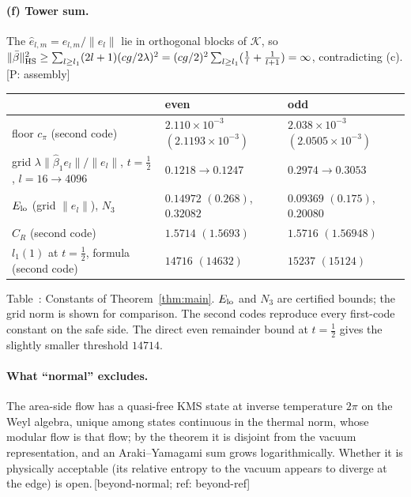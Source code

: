 \documentclass[11pt]{article}
\newcommand{\cK}{\mathcal{K}}
\newcommand{\ev}[1]{\,{\textsf{\scriptsize[#1]}}}
\newcommand{\tabcap}[2]{\par\smallskip\refstepcounter{table}\label{#1}{\small Table~\thetable: #2}\par}
\begin{document}
\paragraph{(f) Tower sum.} The $\hat e_{l,m}=e_{l,m}/\|e_l\|$ lie in orthogonal blocks of $\cK$, so $\|\bar\beta\|_{\rm HS}^2\ge\sum_{l\ge l_1}(2l+1)(cg/2\lambda)^2=(cg/2)^2\sum_{l\ge l_1}(\frac1l+\frac1{l+1})=\infty$, contradicting (c).\ev{P: assembly}

\par\medskip\noindent\begin{minipage}{\textwidth}\centering\footnotesize
\begin{tabular}{lll}
\toprule
 & even & odd\\
\midrule
floor $c_\pi$ (second code) & $2.110\times10^{-3}$ $(2.1193\times10^{-3})$ & $2.038\times10^{-3}$ $(2.0505\times10^{-3})$\\
grid $\lambda\|\hat\beta_1e_l\|/\|e_l\|$, $t=\frac12$, $l=16\to4096$ & $0.1218\to0.1247$ & $0.2974\to0.3053$\\
$E_{\rm lo}$ (grid $\|e_l\|$), $N_3$ & $0.14972$ $(0.268)$, $0.32082$ & $0.09369$ $(0.175)$, $0.20080$\\
$C_R$ (second code) & $1.5714$ $(1.5693)$ & $1.5716$ $(1.56948)$\\
$l_1(1)$ at $t=\frac12$, formula (second code) & $14716$ $(14632)$ & $15237$ $(15124)$\\
\bottomrule
\end{tabular}
\tabcap{tab:const}{Constants of Theorem~\ref{thm:main}. $E_{\rm lo}$ and $N_3$ are certified bounds; the grid norm is shown for comparison. The second codes reproduce every first-code constant on the safe side. The direct even remainder bound at $t=\frac12$ gives the slightly smaller threshold $14714$.}
\end{minipage}\par\medskip

\paragraph{What ``normal'' excludes.} The area-side flow has a quasi-free KMS state at inverse temperature $2\pi$ on the Weyl algebra, unique among states continuous in the thermal norm, whose modular flow is that flow; by the theorem it is disjoint from the vacuum representation, and an Araki--Yamagami sum grows logarithmically. Whether it is physically acceptable (its relative entropy to the vacuum appears to diverge at the edge) is open.\ev{beyond-normal; ref: beyond-ref}
\end{document}
